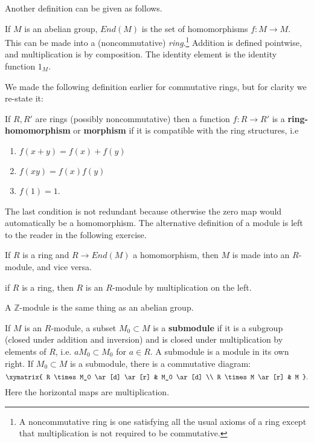 Another definition can be given as follows. \begin{definition} If $M$ is an
abelian group, $End(M)$ is the set of homomorphisms $f: M \to M$. This can be
made into a (noncommutative) \emph{ring}.\footnote{A noncommutative ring is one
satisfying all the usual axioms of a ring except that multiplication is not
required to be commutative.} Addition is defined pointwise, and multiplication
is by composition. The identity element is the identity function $1_M$.
\end{definition}

We made the following definition earlier for commutative rings, but for clarity
we re-state it: \begin{definition} If $R, R'$ are rings (possibly
noncommutative) then a function $f: R \to R'$ is a \textbf{ring-homomorphism}
or \textbf{morphism} if it is compatible with the ring structures, i.e
\begin{enumerate} \item $f(x+y) = f(x) + f(y)$ \item $f(xy) = f(x)f(y)$ \item
$f(1) = 1$. \end{enumerate} \end{definition}

The last condition is not redundant because otherwise the zero map would
automatically be a homomorphism. The alternative definition of a module is left
to the reader in the following exercise. \begin{exercise} If $R$ is a ring and
$R \to End(M)$ a homomorphism, then $M$ is made into an $R$-module, and vice
versa. \end{exercise}

\begin{example} if $R$ is a ring, then $R$ is an $R$-module by multiplication
on the left. \end{example} \begin{example} A $\mathbb{Z}$-module is the same
thing as an abelian group. \end{example}

\begin{definition} If $M$ is an $R$-module, a subset $M_0 \subset M$ is a
\textbf{submodule} if it is a subgroup (closed under addition and inversion)
and is closed under multiplication by elements of $R$, i.e. $aM_0 \subset M_0$
for $a \in R$. A submodule is a module in its own right. If $M_0 \subset M$ is
a submodule, there is a commutative diagram: \[ \xymatrix{ R \times M_0 \ar[d]
\ar[r] & M_0 \ar[d] \\ R \times M \ar[r] & M }.\] Here the horizontal maps are
multiplication. \end{definition}

